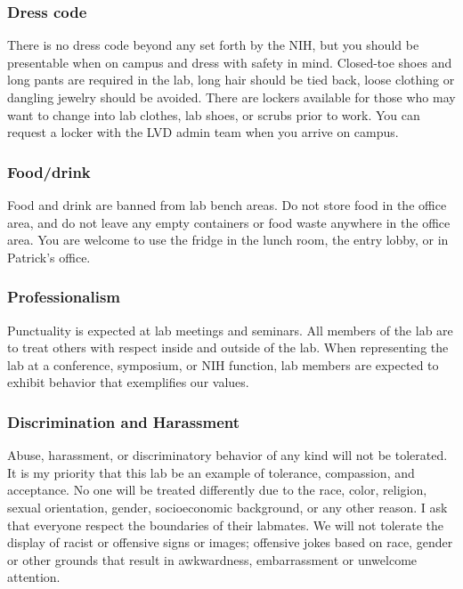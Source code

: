 \documentclass[10pt, letterpaper, twocolumn]{article} %
\begin{document}
\subsubsection{Dress code} There is no dress code beyond any set forth by the NIH, but you should be presentable when on campus and dress with safety in mind. Closed-toe shoes and long pants are required in the lab, long hair should be tied back, loose clothing or dangling jewelry should be avoided. There are lockers available for those who may want to change into lab clothes, lab shoes, or scrubs prior to work. You can request a locker with the LVD admin team when you arrive on campus.

\subsubsection{Food/drink} Food and drink are banned from lab bench areas. Do not store food in the office area, and do not leave any empty containers or food waste anywhere in the office area. You are welcome to use the fridge in the lunch room, the entry lobby, or in Patrick's office.

\subsubsection{Professionalism}
Punctuality is expected at lab meetings and seminars. All members of the lab are to treat others with respect inside and outside of the lab. When representing the lab at a conference, symposium, or NIH function, lab members are expected to exhibit behavior that exemplifies our values.

\subsubsection{Discrimination and Harassment}
Abuse, harassment, or discriminatory behavior of any kind will not be tolerated. It is my priority that this lab be an example of tolerance, compassion, and acceptance. No one will be treated differently due to the race, color, religion, sexual orientation, gender, socioeconomic background, or any other reason. I ask that everyone respect the boundaries of their labmates. We will not tolerate the display of racist or offensive signs or images; offensive jokes based on race, gender or other grounds that result in awkwardness, embarrassment or unwelcome attention.  
\end{document}
